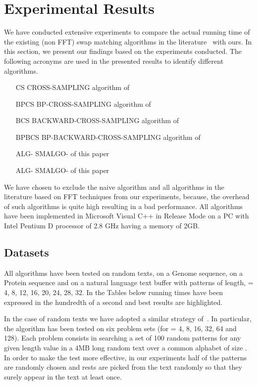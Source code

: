 \documentclass{llncs}
\newcommand{\rom}[1]{\uppercase\expandafter{\romannumeral #1\relax}}
\begin{document}
{\section{Experimental Results}\label{experiment}

We have conducted extensive experiments to compare the actual running time of the existing (non FFT) swap matching algorithms in the literature~\cite{CS,CCS} with ours. In this section, we present our findings based on the experiments conducted. The following acronyms are used in the presented results to identify different algorithms.


\begin{itemize}
\item[CS] CROSS-SAMPLING algorithm of~\cite{CS}
\item[BPCS] BP-CROSS-SAMPLING algorithm of~\cite{CS}
\item[BCS] BACKWARD-CROSS-SAMPLING algorithm of~\cite{CCS}
\item[BPBCS] BP-BACKWARD-CROSS-SAMPLING algorithm of~\cite{CCS}
\item[ALG-\rom{1}] SMALGO-\rom{1} of this paper
\item[ALG-\rom{2}] SMALGO-\rom{2} of this paper
\end{itemize} 

 


We have chosen to exclude the naive algorithm and all algorithms in the literature based on FFT techniques from our experiments, because, the overhead of such algorithms is quite high resulting in a bad performance. All algorithms have been implemented in Microsoft Visual C++ in Release Mode on a PC with Intel Pentium D processor of 2.8 GHz having a memory of 2GB.

\subsection{Datasets}
All algorithms have been tested on random texts, on a Genome sequence, on a Protein sequence and on a natural language text buffer with patterns of length,  = 4, 8, 12, 16, 20, 24, 28, 32. In the Tables below running times have been expressed in the hundredth of a second and best results are highlighted.


In the case of random texts we have adopted a similar strategy of~\cite{CS,CCS}. In particular, the algorithm has been tested on six  problem sets (for  = 4, 8, 16, 32, 64 and 128). Each  problem consists in searching a set of 100 random patterns for any given length value in a 4MB long random text over a common alphabet of size . In order to make the test more effective, in our experiments half of the patterns are randomly chosen and rests are picked from the text randomly so that they surely appear in the text at least once. 



}
\end{document}
